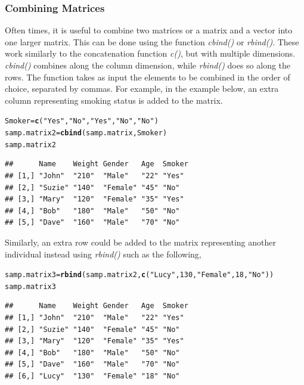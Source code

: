 \documentclass{report}\usepackage[]{graphicx}\usepackage[]{color}
\makeatletter
\newcommand{\hlnum}[1]{\textcolor[rgb]{0.686,0.059,0.569}{#1}}%
\newcommand{\hlstr}[1]{\textcolor[rgb]{0.192,0.494,0.8}{#1}}%
\newcommand{\hlstd}[1]{\textcolor[rgb]{0.345,0.345,0.345}{#1}}%
\newcommand{\hlkwb}[1]{\textcolor[rgb]{0.69,0.353,0.396}{#1}}%
\newcommand{\hlkwd}[1]{\textcolor[rgb]{0.737,0.353,0.396}{\textbf{#1}}}%
\newenvironment{kframe}{%
 \def\at@end@of@kframe{}%
 \ifinner\ifhmode%
  \def\at@end@of@kframe{\end{minipage}}%
  \begin{minipage}{\columnwidth}%
 \fi\fi%
 \def\FrameCommand##1{\hskip\@totalleftmargin \hskip-\fboxsep
 \colorbox{shadecolor}{##1}\hskip-\fboxsep
     \hskip-\linewidth \hskip-\@totalleftmargin \hskip\columnwidth}%
 \MakeFramed {\advance\hsize-\width
   \@totalleftmargin\z@ \linewidth\hsize
   \@setminipage}}%
 {\par\unskip\endMakeFramed%
 \at@end@of@kframe}
\newenvironment{knitrout}{}{} %
\makeatother
\begin{document}
\subsubsection{Combining Matrices}
Often times, it is useful to combine two matrices or a matrix and a vector into one larger matrix.  This can be done using the function \textit{cbind()} or \textit{rbind()}.  These work similarly to the concatenation function \textit{c()}, but with multiple dimensions.  \textit{cbind()} combines along the column dimension, while \textit{rbind()} does so along the rows.  The function takes as input the elements to be combined in the order of choice, separated by commas.  For example, in the example below, an extra column representing smoking status is added to the matrix.  
\begin{knitrout}
\color{fgcolor}\begin{kframe}
\begin{alltt}
\hlstd{Smoker} \hlkwb{=} \hlkwd{c}\hlstd{(}\hlstr{"Yes"}\hlstd{,} \hlstr{"No"}\hlstd{,} \hlstr{"Yes"}\hlstd{,} \hlstr{"No"}\hlstd{,} \hlstr{"No"}\hlstd{)}
\hlstd{samp.matrix2} \hlkwb{=} \hlkwd{cbind}\hlstd{(samp.matrix, Smoker)}
\hlstd{samp.matrix2}
\end{alltt}
\begin{verbatim}
##      Name    Weight Gender   Age  Smoker
## [1,] "John"  "210"  "Male"   "22" "Yes" 
## [2,] "Suzie" "140"  "Female" "45" "No"  
## [3,] "Mary"  "120"  "Female" "35" "Yes" 
## [4,] "Bob"   "180"  "Male"   "50" "No"  
## [5,] "Dave"  "160"  "Male"   "70" "No"
\end{verbatim}
\end{kframe}
\end{knitrout}


Similarly, an extra row could be added to the matrix representing another individual instead using \textit{rbind()} such as the following, 
\begin{knitrout}
\color{fgcolor}\begin{kframe}
\begin{alltt}
\hlstd{samp.matrix3} \hlkwb{=} \hlkwd{rbind}\hlstd{(samp.matrix2,} \hlkwd{c}\hlstd{(}\hlstr{"Lucy"}\hlstd{,} \hlnum{130}\hlstd{,} \hlstr{"Female"}\hlstd{,} \hlnum{18}\hlstd{,} \hlstr{"No"}\hlstd{))}
\hlstd{samp.matrix3}
\end{alltt}
\begin{verbatim}
##      Name    Weight Gender   Age  Smoker
## [1,] "John"  "210"  "Male"   "22" "Yes" 
## [2,] "Suzie" "140"  "Female" "45" "No"  
## [3,] "Mary"  "120"  "Female" "35" "Yes" 
## [4,] "Bob"   "180"  "Male"   "50" "No"  
## [5,] "Dave"  "160"  "Male"   "70" "No"  
## [6,] "Lucy"  "130"  "Female" "18" "No"
\end{verbatim}
\end{kframe}
\end{knitrout}
\end{document}
